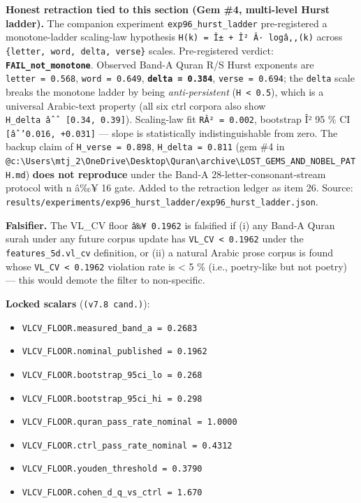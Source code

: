 \documentclass[
]{article}
\providecommand{\tightlist}{%
  \setlength{\itemsep}{0pt}\setlength{\parskip}{0pt}}
\begin{document}
\textbf{Honest retraction tied to this section (Gem \#4, multi-level
Hurst ladder).} The companion experiment \texttt{exp96\_hurst\_ladder}
pre-registered a monotone-ladder scaling-law hypothesis
\texttt{H(k)\ =\ Î±\ +\ Î²\ Â·\ logâ‚‚(k)} across
\texttt{\{letter,\ word,\ delta,\ verse\}} scales. Pre-registered
verdict: \textbf{\texttt{FAIL\_not\_monotone}}. Observed Band-A Quran
R/S Hurst exponents are \texttt{letter\ =\ 0.568},
\texttt{word\ =\ 0.649}, \textbf{\texttt{delta\ =\ 0.384}},
\texttt{verse\ =\ 0.694}; the \texttt{delta} scale breaks the monotone
ladder by being \emph{anti-persistent} (\texttt{H\ \textless{}\ 0.5}),
which is a universal Arabic-text property (all six ctrl corpora also
show \texttt{H\_delta\ âˆˆ\ {[}0.34,\ 0.39{]}}). Scaling-law fit
\texttt{RÂ²\ =\ 0.002}, bootstrap Î² 95 \% CI
\texttt{{[}âˆ’0.016,\ +0.031{]}} --- slope is statistically
indistinguishable from zero. The backup claim of
\texttt{H\_verse\ =\ 0.898}, \texttt{H\_delta\ =\ 0.811} (gem \#4 in
\texttt{@c:\textbackslash{}Users\textbackslash{}mtj\_2\textbackslash{}OneDrive\textbackslash{}Desktop\textbackslash{}Quran\textbackslash{}archive\textbackslash{}LOST\_GEMS\_AND\_NOBEL\_PATH.md})
\textbf{does not reproduce} under the Band-A 28-letter-consonant-stream
protocol with n â‰¥ 16 gate. Added to the retraction ledger as item 26.
Source:
\texttt{results/experiments/exp96\_hurst\_ladder/exp96\_hurst\_ladder.json}.

\textbf{Falsifier.} The VL\_CV floor \texttt{â‰¥\ 0.1962} is falsified
if (i) any Band-A Quran surah under any future corpus update has
\texttt{VL\_CV\ \textless{}\ 0.1962} under the
\texttt{features\_5d.vl\_cv} definition, or (ii) a natural Arabic prose
corpus is found whose \texttt{VL\_CV\ \textless{}\ 0.1962} violation
rate is \textless{} 5 \% (i.e., poetry-like but not poetry) --- this
would demote the filter to non-specific.

\textbf{Locked scalars} (\texttt{(v7.8\ cand.)}):

\begin{itemize}
\tightlist
\item
  \texttt{VLCV\_FLOOR.measured\_band\_a\ =\ 0.2683}
\item
  \texttt{VLCV\_FLOOR.nominal\_published\ =\ 0.1962}
\item
  \texttt{VLCV\_FLOOR.bootstrap\_95ci\_lo\ =\ 0.268}
\item
  \texttt{VLCV\_FLOOR.bootstrap\_95ci\_hi\ =\ 0.298}
\item
  \texttt{VLCV\_FLOOR.quran\_pass\_rate\_nominal\ =\ 1.0000}
\item
  \texttt{VLCV\_FLOOR.ctrl\_pass\_rate\_nominal\ =\ 0.4312}
\item
  \texttt{VLCV\_FLOOR.youden\_threshold\ =\ 0.3790}
\item
  \texttt{VLCV\_FLOOR.cohen\_d\_q\_vs\_ctrl\ =\ 1.670}
\end{itemize}
\end{document}
